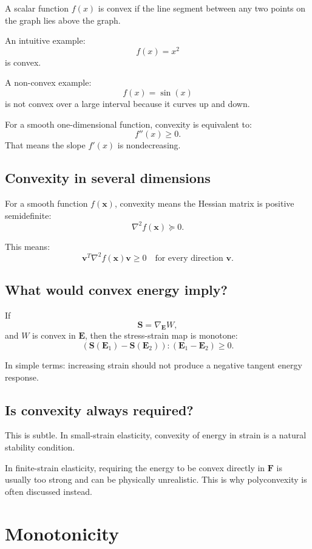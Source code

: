 \documentclass[11pt]{article}
\newcommand{\E}{\bm{E}}
\newcommand{\F}{\bm{F}}
\newcommand{\Sstress}{\bm{S}}
\begin{document}
A scalar function $f(x)$ is convex if the line segment between any two points on
the graph lies above the graph.

An intuitive example:
\[
  f(x)=x^2
\]
is convex.

A non-convex example:
\[
  f(x)=\sin(x)
\]
is not convex over a large interval because it curves up and down.

For a smooth one-dimensional function, convexity is equivalent to:
\[
  f''(x) \ge 0.
\]
That means the slope $f'(x)$ is nondecreasing.

\subsection{Convexity in several dimensions}

For a smooth function $f(\bm{x})$, convexity means the Hessian matrix is positive
semidefinite:
\[
  \nabla^2 f(\bm{x}) \succeq 0.
\]

This means:
\[
  \bm{v}^T \nabla^2 f(\bm{x}) \bm{v} \ge 0
  \quad
  \text{for every direction } \bm{v}.
\]

\subsection{What would convex energy imply?}

If
\[
  \Sstress = \nabla_{\E}W,
\]
and $W$ is convex in $\E$, then the stress-strain map is monotone:
\[
  \left(
    \Sstress(\E_1)-\Sstress(\E_2)
  \right)
  :
  \left(
    \E_1-\E_2
  \right)
  \ge 0.
\]

In simple terms: increasing strain should not produce a negative tangent energy
response.

\subsection{Is convexity always required?}

This is subtle. In small-strain elasticity, convexity of energy in strain is a
natural stability condition.

In finite-strain elasticity, requiring the energy to be convex directly in $\F$
is usually too strong and can be physically unrealistic. This is why
polyconvexity is often discussed instead.

\section{Monotonicity}
\end{document}
